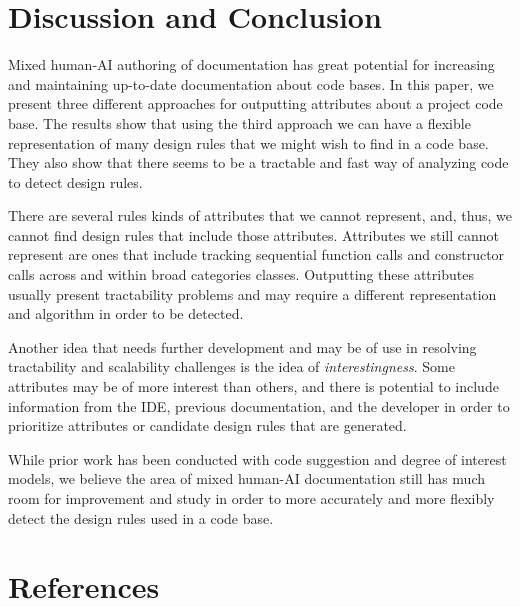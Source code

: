\documentclass[12pt]{article}
\begin{document}

\section{Discussion and Conclusion}\label{disc}

Mixed human-AI authoring of documentation has great potential for increasing and maintaining up-to-date documentation about code bases. In this paper, we present three different approaches for outputting attributes about a project code base. The results show that using the third approach we can have a flexible representation of  many design rules that we might wish to find in a code base. They also show that there seems to be a tractable and fast way of analyzing code to detect design rules.

There are several rules kinds of attributes that we cannot represent, and, thus, we cannot find design rules that include those attributes. Attributes we still cannot represent are ones that include tracking sequential function calls and constructor calls across and within broad categories classes. Outputting these attributes usually present tractability problems and may require a different representation and algorithm in order to be detected.

Another idea that needs further development and may be of use in resolving tractability and scalability challenges is the idea of \textit{interestingness}. Some attributes may be of more interest than others, and there is potential to include information from the IDE, previous documentation, and the developer in order to prioritize attributes or candidate design rules that are generated.

While prior work has been conducted with code suggestion and degree of interest models, we believe the area of mixed human-AI documentation still has much room for improvement and study in order to more accurately and more flexibly detect the design rules used in a code base.


\clearpage

\section{References}\label{references}

\printbibliography
\end{document}
